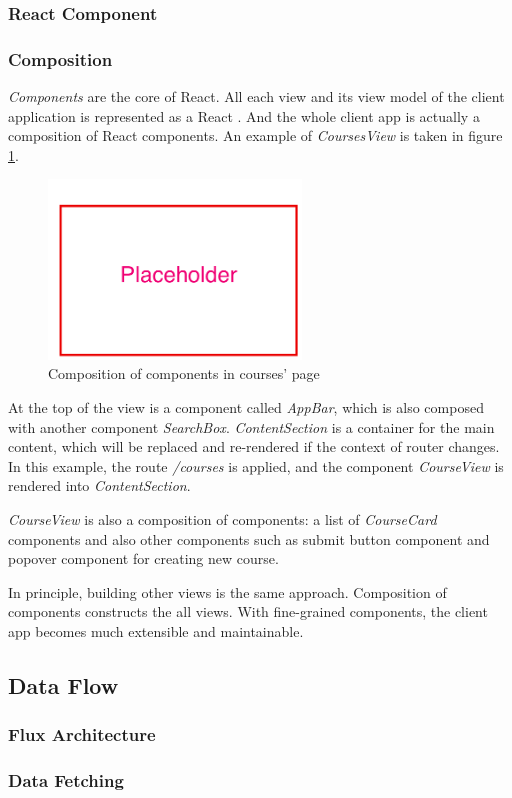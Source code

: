 \subsubsection{React Component}


\subsubsection{Composition}
\textit{Components} are the core of React. All each view and its view model of the client application is represented as a React . And the whole client app is actually a composition of React components. An example of \textit{CoursesView} is taken in figure \ref{fig:course-view-composition-imp}.

\begin{figure}[!htbp]
  \centering
    \includegraphics[width=0.6\textwidth]{Figures/placeholder.png}
  \caption{Composition of components in courses' page}
  \label{fig:course-view-composition-imp}
\end{figure}

At the top of the view is a component called \textit{AppBar}, which is also composed with another component \textit{SearchBox}. \textit{ContentSection} is a container for the main content, which will be replaced and re-rendered if the context of router changes. In this example, the route \textit{/courses} is applied, and the component \textit{CourseView} is rendered into \textit{ContentSection}. 

\textit{CourseView} is also a composition of components: a list of \textit{CourseCard} components and also other components such as submit button component and popover component for creating new course. 

In principle, building other views is the same approach. Composition of components constructs the all views. With fine-grained components, the client app becomes much extensible and maintainable.


\subsection{Data Flow}

\subsubsection{Flux Architecture}

\subsubsection{Data Fetching}
